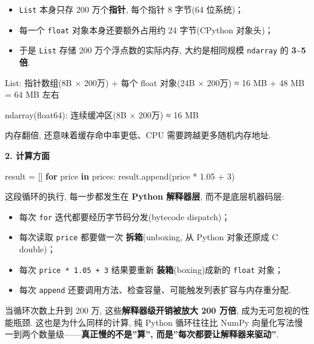 \documentclass[11pt]{article}
\providecommand{\tightlist}{%
      \setlength{\itemsep}{0pt}\setlength{\parskip}{0pt}}
\newenvironment{Shaded}{}{}
\newcommand{\KeywordTok}[1]{\textcolor[rgb]{0.00,0.44,0.13}{\textbf{{#1}}}}
\newcommand{\DecValTok}[1]{\textcolor[rgb]{0.25,0.63,0.44}{{#1}}}
\newcommand{\FloatTok}[1]{\textcolor[rgb]{0.25,0.63,0.44}{{#1}}}
\newcommand{\NormalTok}[1]{{#1}}
\newcommand{\ControlFlowTok}[1]{\textcolor[rgb]{0.00,0.44,0.13}{\textbf{{#1}}}}
\newcommand{\OperatorTok}[1]{\textcolor[rgb]{0.40,0.40,0.40}{{#1}}}
\begin{document}
\begin{itemize}
\tightlist
\item
  \texttt{List} 本身只存 200 万个\textbf{指针}, 每个指针 8 字节(64
  位系统)；
\item
  每一个 \texttt{float} 对象本身还要额外占用约 24 字节(CPython 对象头)；
\item
  于是 \texttt{List} 存储 200 万个浮点数的实际内存, 大约是相同规模
  \texttt{ndarray} 的 \textbf{3\textasciitilde5 倍}.
\end{itemize}

\begin{Shaded}
\begin{Highlighting}[]
\NormalTok{List:}
\NormalTok{  指针数组(8B × 200万) + 每个 float 对象(24B × 200万)}
\NormalTok{  ≈ 16 MB + 48 MB = 64 MB 左右}

\NormalTok{ndarray(float64):}
\NormalTok{  连续缓冲区(8B × 200万)}
\NormalTok{  ≈ 16 MB}
\end{Highlighting}
\end{Shaded}

内存翻倍, 还意味着缓存命中率更低、CPU 需要跨越更多随机内存地址.

\textbf{2. 计算方面}

\begin{Shaded}
\begin{Highlighting}[]
\NormalTok{result }\OperatorTok{=}\NormalTok{ []}
\ControlFlowTok{for}\NormalTok{ price }\KeywordTok{in}\NormalTok{ prices:}
\NormalTok{    result.append(price }\OperatorTok{*} \FloatTok{1.05} \OperatorTok{+} \DecValTok{3}\NormalTok{)}
\end{Highlighting}
\end{Shaded}

这段循环的执行, 每一步都发生在 \textbf{Python 解释器层},
而不是底层机器码层:

\begin{itemize}
\tightlist
\item
  每次 \texttt{for} 迭代都要经历字节码分发(bytecode dispatch)；
\item
  每次读取 \texttt{price} 都要做一次 \textbf{拆箱}(unboxing, 从 Python
  对象还原成 C double)；
\item
  每次 \texttt{price\ *\ 1.05\ +\ 3} 结果要重新
  \textbf{装箱}(boxing)成新的 \texttt{float} 对象；
\item
  每次 \texttt{append}
  还要调用方法、检查容量、可能触发列表扩容与内存重分配.
\end{itemize}

当循环次数上升到 200 万, 这些\textbf{解释器级开销被放大 200 万倍},
成为无可忽视的性能瓶颈. 这也是为什么同样的计算, 纯 Python 循环往往比
NumPy 向量化写法慢一到两个数量级------\textbf{真正慢的不是''算'',
而是''每次都要让解释器来驱动''}.
\end{document}
